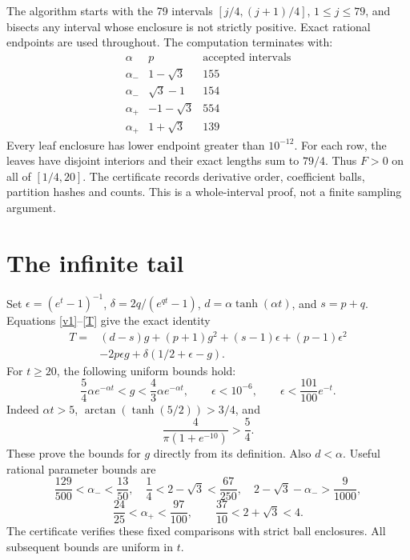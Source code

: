 \documentclass[11pt]{article}
\begin{document}
The algorithm starts with the 79 intervals
\([j/4,(j+1)/4]\), \(1\le j\le79\), and bisects any interval
whose enclosure is not strictly positive. Exact rational endpoints
are used throughout. The computation terminates with:
\[
\begin{array}{c|c|r}
 \alpha&p&\text{accepted intervals}\\ \hline
 \alpha_-&1-\sqrt3&155\\
 \alpha_-&\sqrt3-1&154\\
 \alpha_+&-1-\sqrt3&554\\
 \alpha_+&1+\sqrt3&139
\end{array}
\]
Every leaf enclosure has lower endpoint greater than \(10^{-12}\).
For each row, the leaves have disjoint interiors and their exact
lengths sum to \(79/4\). Thus \(F>0\) on all of \([1/4,20]\).
The certificate records derivative order, coefficient balls,
partition hashes and counts. This is a whole-interval proof,
not a finite sampling argument.

\section*{The infinite tail}
Set \(\epsilon=(e^t-1)^{-1}\),
\(\delta=2q/(e^{qt}-1)\), \(d=\alpha\tanh(\alpha t)\), and \(s=p+q\).
Equations \eqref{v1}--\eqref{T} give the exact identity
\begin{equation}\label{expanded}
\begin{split}
 T={}&(d-s)g+(p+1)g^2+(s-1)\epsilon+(p-1)\epsilon^2\\
    &-2p\epsilon g+\delta(1/2+\epsilon-g).
\end{split}
\end{equation}
For \(t\ge20\), the following uniform bounds hold:
\begin{equation}\label{basicbounds}
 \frac54\alpha e^{-\alpha t}<g<
 \frac43\alpha e^{-\alpha t},\qquad
 \epsilon<10^{-6},\qquad
 \epsilon<\frac{101}{100}e^{-t}.
\end{equation}
Indeed \(\alpha t>5\),
\(\arctan(\tanh(5/2))>3/4\), and
\[
 \frac4{\pi(1+e^{-10})}>\frac54.
\]
These prove the bounds for \(g\) directly from its definition.
Also \(d<\alpha\). Useful rational parameter bounds are
\[
 \frac{129}{500}<\alpha_-<\frac{13}{50},\quad
 \frac14<2-\sqrt3<\frac{67}{250},\quad
 2-\sqrt3-\alpha_->\frac9{1000},
\]
\[
 \frac{24}{25}<\alpha_+<\frac{97}{100},\qquad
 \frac{37}{10}<2+\sqrt3<4.
\]
The certificate verifies these fixed comparisons with strict ball
enclosures. All subsequent bounds are uniform in \(t\).
\end{document}
